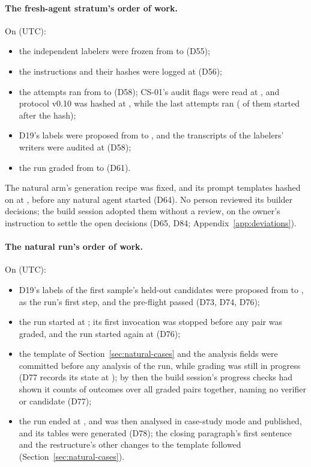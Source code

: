 \paragraph{The fresh-agent stratum's order of work.} On  (UTC):
\begin{itemize}
\item the independent labelers were frozen from  to  (D55);
\item the instructions and their hashes were logged at  (D56);
\item the attempts ran from  to  (D58); CS-01's audit flags were read at
  , and protocol v0.10 was hashed at , while the last
   attempts ran ( of them started after the
  hash);
\item D19's labels were proposed from  to , and the transcripts of the
  labelers' writers were audited at  (D58);
\item the run graded from  to  (D61).
\end{itemize}
The natural arm's generation recipe was fixed, and its  prompt templates hashed on
 at , before any natural agent started (D64). No person reviewed
its builder decisions; the build session adopted them without a review, on the owner's instruction to settle the open
decisions (D65, D84; Appendix~\ref{app:deviations}).

\paragraph{The natural run's order of work.} On  (UTC):
\begin{itemize}
\item D19's labels of the first sample's held-out candidates were proposed from  to
  , as the run's first step, and the pre-flight passed (D73, D74, D76);
\item the run started at ; its first invocation was stopped before any pair was graded, and the run
  started again at  (D76);
\item the template of Section~\ref{sec:natural-cases} and the analysis fields were committed before any analysis of the
  run, while grading was still in progress (D77 records its state at ); by then the build
  session's progress checks had shown it counts of outcomes over all graded pairs together, naming no verifier or
  candidate (D77);
\item the run ended at , and was then analysed in case-study mode and published, and its tables were
  generated (D78); the closing paragraph's first sentence and the restructure's other changes to the template followed
  (Section~\ref{sec:natural-cases}).
\end{itemize}

